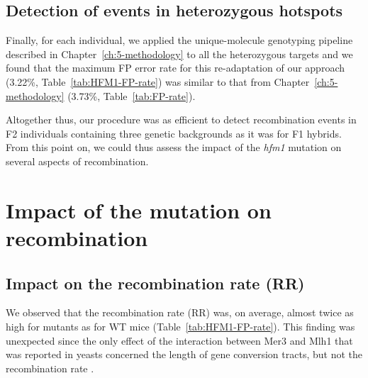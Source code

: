 

\subsection{Detection of events in heterozygous hotspots}

Finally, for each individual, we applied the unique-molecule genotyping pipeline described in Chapter~\ref{ch:5-methodology} to all the heterozygous targets and we found that the maximum FP error rate for this re-adaptation of our approach (3.22\%, Table~\ref{tab:HFM1-FP-rate}) was similar to that from Chapter~\ref{ch:5-methodology} (3.73\%, Table~\ref{tab:FP-rate}).

Altogether thus, our procedure was as efficient to detect recombination events in F2 individuals containing three genetic backgrounds as it was for F1 hybrids.
From this point on, we could thus assess the impact of the \textit{hfm1} mutation on several aspects of recombination.







\section{Impact of the mutation on recombination}
\subsection{Impact on the recombination rate (RR)}
\label{chap8:recombination-rate}

We observed that the recombination rate (RR) was, on average, almost twice as high for mutants as for WT mice (Table~\ref{tab:HFM1-FP-rate}).
This finding was unexpected since the only effect of the interaction between Mer3 and Mlh1 that was reported in yeasts concerned the length of gene conversion tracts, but not the recombination rate \citep{duroc2017concerted}.

